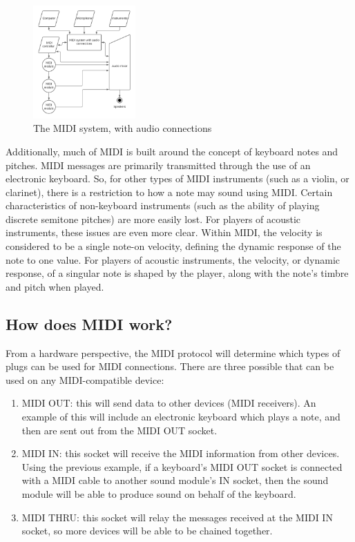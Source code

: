 \begin{figure}
	\centering
	\includegraphics[width=0.35\textwidth]{figures/midi-system-with-audio-connections.png}
	\caption{The MIDI system, with audio connections}
	\label{fig:midi-system-with-audio-connections}
\end{figure}

Additionally, much of MIDI is built around the concept of keyboard notes and pitches. MIDI messages are primarily transmitted through the use of an electronic keyboard. So, for other types of MIDI instruments (such as a violin, or clarinet), there is a restriction to how a note may sound using MIDI. Certain characteristics of non-keyboard instruments (such as the ability of playing discrete semitone pitches) are more easily lost. For players of acoustic instruments, these issues are even more clear. Within MIDI, the velocity is considered to be a single note-on velocity, defining the dynamic response of the note to one value. For players of acoustic instruments, the velocity, or dynamic response, of a singular note is shaped by the player, along with the note's timbre and pitch when played\cite{Kirk_Hunt_2013}.


\subsection[How does MIDI work?]{How does MIDI work?}\label{section:how-midi}
From a hardware perspective, the MIDI protocol will determine which types of plugs can be used for MIDI connections. There are three possible  that can be used on any MIDI-compatible device:

\begin{enumerate}
	\item MIDI OUT: this will send data to other devices (MIDI receivers). An example of this will include an electronic keyboard which plays a note, and then  are sent out from the MIDI OUT socket.
	\item MIDI IN: this socket will receive the MIDI information from other devices. Using the previous example, if a keyboard's MIDI OUT socket is connected with a MIDI cable to another sound module's IN socket, then the sound module will be able to produce sound on behalf of the keyboard.
	\item MIDI THRU: this socket will relay the messages received at the MIDI IN socket, so more devices will be able to be chained together.
\end{enumerate}\label{enu:list-of-midi-sockets}

